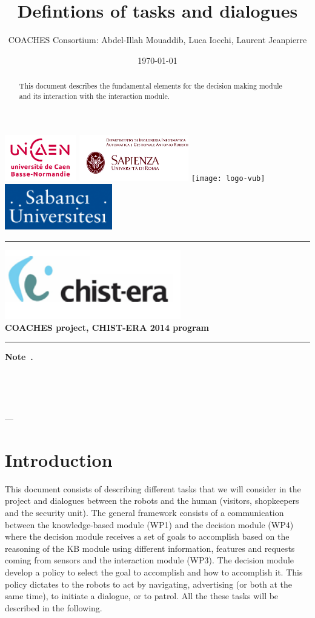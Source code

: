 \documentclass{article}
\title{ Defintions of tasks and dialogues}
\author{COACHES Consortium: Abdel-Illah Mouaddib, Luca Iocchi, Laurent Jeanpierre}
\date{\today}
\newcommand{\makemadtitle}{
  \hrule
  \vspace{.5em}
  \noindent
  \begin{center}
  \textbf{
  {\centering\includegraphics[height=3cm]{../logoCHISTERA2014}}\\
   {\centering\Large COACHES project, CHIST-ERA 2014 program}
  }
  \end{center}
  \vspace{.5em}
 
  \hrule
  \vspace{3em}
  \begin{center}
    \begin{large}\textbf{ Note~\usebox{\notenumber}.}\end{large}\\[.5em]
    \begin{Large}\textbf{\usebox{\notetitle}}\end{Large}\\[2em]
    \begin{large}\usebox{\noteauthor} --- \usebox{\notedate}\end{large}
  \end{center}
  \vspace{3em}
}
\begin{document}
\includegraphics[height=2cm]{../logoUNICAEN.jpg}
\includegraphics[height=2cm]{../logoSapienza.png}
\texttt{[image: logo-vub]}
\includegraphics[height=2cm]{logoSebanci}


\makemadtitle

\vspace*{1.0in}
\begin{abstract}
 This document describes the fundamental elements for the decision making module and its interaction with the interaction module. 
  \end{abstract}

\vspace*{1.5in}

\newpage
\section{Introduction}
This document consists of describing different tasks that we will consider in the project and dialogues between the robots and the human (visitors, shopkeepers and the security unit).  The general framework consists of a communication between the knowledge-based module (WP1) and the decision module (WP4) where the decision module receives a set of goals to accomplish based on the reasoning of the KB module using different information, features and requests coming from sensors and the interaction module (WP3). The decision module develop a policy to select the goal to accomplish and how to accomplish it. This policy dictates to the robots to act by navigating, advertising (or both at the same time), to initiate a dialogue, or to patrol. All the these tasks will be described in the following. 
\end{document}
